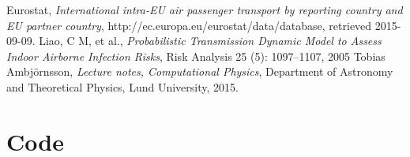 \documentclass[a4paper,12pt]{article}
\theoremstyle{plain}
\theoremstyle{definition}
\begin{document}
\begin{thebibliography}{99}
     Eurostat, 
     \emph{International intra-EU air passenger transport by reporting country and EU
     partner country},
     http://ec.europa.eu/eurostat/data/database, 
     retrieved 2015-09-09.
     Liao, C M, et al.,
     \emph{Probabilistic Transmission Dynamic Model to Assess Indoor Airborne Infection
     Risks},
     Risk Analysis 25 (5): 1097–1107, 
     2005
     Tobias Ambjörnsson,
     \emph{Lecture notes, Computational Physics},
     Department of Astronomy and Theoretical Physics,
     Lund University,
     2015.
\end{thebibliography}
\newpage
\appendix
\section*{Code}
      
      
      
      
      
\end{document}
